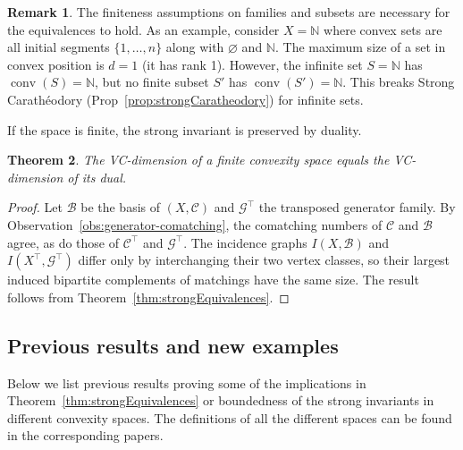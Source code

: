 \documentclass[11pt]{article}
\newtheorem{thm}{Theorem}[section]%
\theoremstyle{definition}
\newtheorem{rem}[thm]{Remark}
\newcommand{\C}{\mathcal{C}}
\newcommand{\B}{\mathcal{B}}
\newcommand{\G}{\mathcal{G}}
\newcommand{\conv}{\operatorname{conv}}
\begin{document}
\begin{rem}
    The finiteness assumptions on families and subsets are necessary for the equivalences to hold. As an example, consider $X = \mathbb{N}$ where convex sets are all initial segments $\{1, \dots, n\}$ along with $\varnothing$ and $\mathbb{N}$. The maximum size of a set in convex position is $d=1$ (it has rank 1). However, the infinite set $S = \mathbb{N}$ has $\conv(S) = \mathbb{N}$, but no finite subset $S'$ has $\conv(S') = \mathbb{N}$. This breaks Strong Carath\'eodory (Prop~\ref{prop:strongCaratheodory}) for infinite sets.
\end{rem}

If the space is finite, the strong invariant is preserved by duality.

\begin{thm}\label{thm:VC-dual}
The VC-dimension of a finite convexity space equals the VC-dimension of its dual.
\end{thm}

\begin{proof}
Let $\B$ be the basis of $(X,\C)$ and $\G^\top$ the transposed generator family. By Observation~\ref{obs:generator-comatching}, the comatching numbers of $\C$ and $\B$ agree, as do those of $\C^\top$ and $\G^\top$. The incidence graphs $I(X,\B)$ and $I(X^\top,\G^\top)$ differ only by interchanging their two vertex classes, so their largest induced bipartite complements of matchings have the same size. The result follows from Theorem~\ref{thm:strongEquivalences}.
\end{proof}


\subsection{Previous results and new examples}\label{subsec:strong:history}

Below we list previous results proving some of the implications in Theorem~\ref{thm:strongEquivalences} or boundedness of the strong invariants in different convexity spaces. The definitions of all the different spaces can be found in the corresponding papers.
\end{document}
